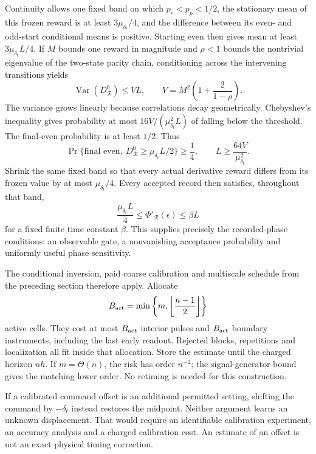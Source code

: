 \documentclass[11pt,a4paper]{article}
\numberwithin{equation}{section}
\theoremstyle{remark}
\begin{document}
Continuity allows one fixed band on which $p_e<p_p<1/2$, the stationary
mean of this frozen reward is at least $3\mu_{\delta_t}/4$, and the difference
between its even- and odd-start conditional means is positive. Starting
even then gives mean at least $3\mu_{\delta_t} L/4$. If $M$ bounds one reward
in magnitude and $\rho<1$ bounds the nontrivial eigenvalue of the two-state
parity chain, conditioning across the intervening transitions yields
\begin{equation}
 \operatorname{Var}(D_{\mathcal R}^0)\le VL,
 \qquad V=M^2\left(1+\frac{2}{1-\rho}\right).
\end{equation}
The variance grows linearly because correlations decay geometrically.
Chebyshev's inequality gives probability at most
$16V/(\mu_{\delta_t}^2L)$ of falling below the threshold. The final-even
probability is at least $1/2$. Thus
\begin{equation}
 \Pr\{\text{final even},\ D_{\mathcal R}^0\ge\mu_{\delta_t} L/2\}\ge\frac14,
 \qquad L\ge\frac{64V}{\mu_{\delta_t}^2}.
\end{equation}
Shrink the same fixed band so that every actual derivative reward differs
from its frozen value by at most $\mu_{\delta_t}/4$. Every accepted record then
satisfies, throughout that band,
\begin{equation}
 \frac{\mu_{\delta_t} L}{4}\le\Phi'_{\mathcal R}(\epsilon)\le\beta L
\end{equation}
for a fixed finite time constant $\beta$. This supplies precisely the
recorded-phase conditions: an observable gate, a nonvanishing acceptance
probability and uniformly useful phase sensitivity.

The conditional inversion, paid coarse calibration and multiscale schedule
from the preceding section therefore apply. Allocate
\begin{equation}
 B_{\rm act}=\min\left\{m,\left\lfloor\frac{n-1}{2}\right\rfloor\right\}
\end{equation}
active cells. They cost at most $B_{\rm act}$ interior pulses and
$B_{\rm act}$ boundary instruments, including the last early readout.
Rejected blocks, repetitions and localization all fit inside that allocation.
Store the estimate until the charged horizon $nh$. If $m=\Theta(n)$, the
risk has order $n^{-2}$; the signal-generator bound gives the matching lower
order. No retiming is needed for this construction.

If a calibrated command offset is an additional permitted setting, shifting
the command by $-\delta_t$ instead restores the midpoint. Neither argument
learns an unknown displacement. That would require an identifiable
calibration experiment, an accuracy analysis and a charged calibration
cost. An estimate of an offset is not an exact physical timing correction.
\end{document}

